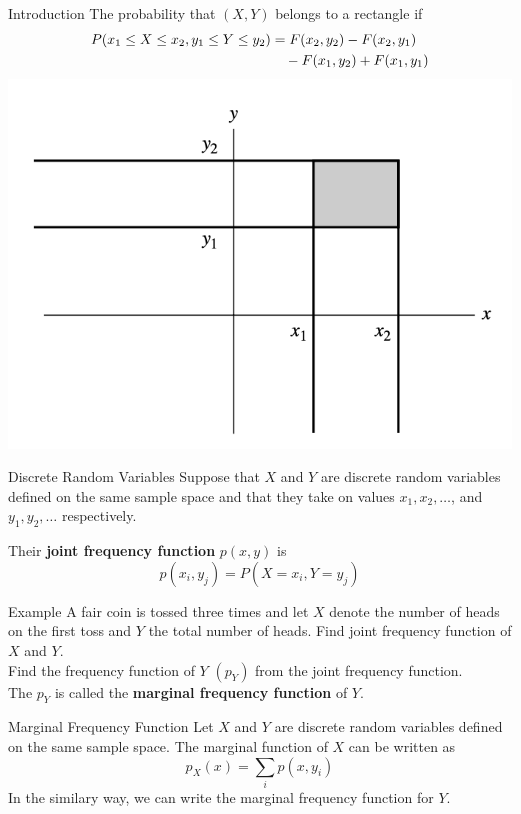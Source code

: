 \documentclass{beamer}
\begin{document}
\begin{frame}{Introduction}
    The probability that \((X,Y)\) belongs to a rectangle if \begin{align*}
        P(x_1 \leq X \leq x_2, y_1 \leq Y \leq y_2) &= F(x_2,y_2) - F(x_2,y_1) \notag \\
        &\quad - F(x_1, y_2) + F(x_1,y_1)
    \end{align*}
    \includegraphics[scale=0.5]{Figures/Figure_6.png}
\end{frame}

\begin{frame}{Discrete Random Variables}
    Suppose that \(X\) and \(Y\) are discrete random variables defined on the same sample space and that they take on values \(x_1,x_2, \dots\), and \(y_1,y_2, \dots\) respectively. \\ \pause
    \vspace{0.1in}

    Their \textbf{joint frequency function} \(p(x,y)\) is \[
    p(x_i, y_j) =P(X=x_i, Y=y_j)
    \]
\end{frame}

\begin{frame}{Example}
    A fair coin is tossed three times and let \(X\) denote the number of heads on the first toss and \(Y\) the total number of heads. Find joint frequency function of \(X\) and \(Y\).  \\ \pause
    \vspace{0.2in}
    Find the frequency function of \(Y\) \((p_Y)\) from the joint frequency function. \\ \pause
    \vspace{0.2in}
    The \(p_Y\) is called the \textbf{marginal frequency function} of \(Y\). 
\end{frame}

\begin{frame}{Marginal Frequency Function}
Let \(X\) and \(Y\) are discrete random variables defined on the same sample space. The marginal function of \(X\) can be written as 
\[p_X(x)= \sum_i p(x,y_i)\] In the similary way, we can write the marginal frequency function for \(Y\).
\end{frame}
\end{document}
